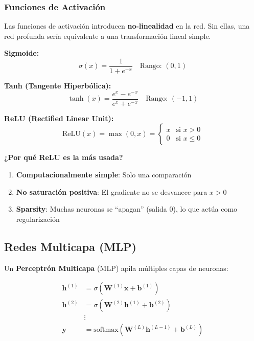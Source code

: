\documentclass[12pt,a4paper]{article}
\begin{document}
\subsubsection{Funciones de Activación}

Las funciones de activación introducen \textbf{no-linealidad} en la red. Sin ellas, una red profunda sería equivalente a una transformación lineal simple.

\begin{mathbox}
\textbf{Sigmoide:}
\begin{equation}
\sigma(x) = \frac{1}{1 + e^{-x}} \quad \text{Rango: } (0, 1)
\end{equation}

\textbf{Tanh (Tangente Hiperbólica):}
\begin{equation}
\tanh(x) = \frac{e^x - e^{-x}}{e^x + e^{-x}} \quad \text{Rango: } (-1, 1)
\end{equation}

\textbf{ReLU (Rectified Linear Unit):}
\begin{equation}
\text{ReLU}(x) = \max(0, x) = \begin{cases} x & \text{si } x > 0 \\ 0 & \text{si } x \leq 0 \end{cases}
\end{equation}
\end{mathbox}

\textbf{¿Por qué ReLU es la más usada?}
\begin{enumerate}
    \item \textbf{Computacionalmente simple}: Solo una comparación
    \item \textbf{No saturación positiva}: El gradiente no se desvanece para $x > 0$
    \item \textbf{Sparsity}: Muchas neuronas se ``apagan'' (salida 0), lo que actúa como regularización
\end{enumerate}

\subsection{Redes Multicapa (MLP)}

Un \textbf{Perceptrón Multicapa} (MLP) apila múltiples capas de neuronas:

\begin{align}
\mathbf{h}^{(1)} &= \sigma(\mathbf{W}^{(1)} \mathbf{x} + \mathbf{b}^{(1)}) \\
\mathbf{h}^{(2)} &= \sigma(\mathbf{W}^{(2)} \mathbf{h}^{(1)} + \mathbf{b}^{(2)}) \\
&\vdots \\
\mathbf{y} &= \text{softmax}(\mathbf{W}^{(L)} \mathbf{h}^{(L-1)} + \mathbf{b}^{(L)})
\end{align}
\end{document}
